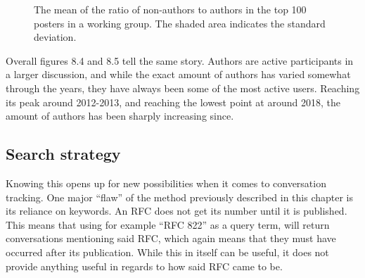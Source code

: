 \documentclass[a4paper,english]{report}
\begin{document}
\begin{figure}[H]
\caption{The mean of the ratio of non-authors to authors in the top 100 posters in a working group.  The shaded area indicates the standard deviation.}
\end{figure}

Overall figures 8.4 and 8.5 tell the same story. Authors are active participants in a larger discussion, and while the exact amount of authors has varied somewhat through the years, they have always been some of the most active users.
Reaching its peak around 2012-2013, and reaching the lowest point at around 2018, the amount of authors has been sharply increasing since. 



\subsection{Search strategy}

Knowing this opens up for new possibilities when it comes to conversation tracking. One major “flaw” of the method previously described in this chapter is its reliance on keywords. An RFC does not get its number until it is published. This means that using for example “RFC 822” as a query term, will return conversations mentioning said RFC, which again means that they must have occurred after its publication. While this in itself can be useful, it does not provide anything useful in regards to how said RFC came to be.
\end{document}
